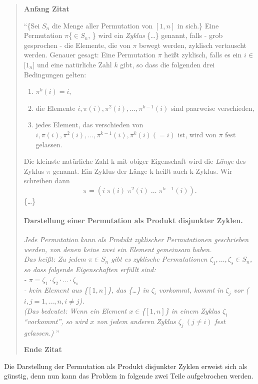 \begin{quotation}
\textbf{Anfang Zitat}

``\{Sei $S_n$ die Menge aller Permutation von $[1,n]$ in sich.\}
Eine Permutation $\pi$\{$\in S_n$, \} wird ein \emph{Zyklus} \{\dots\} genannt, falls - grob gesprochen - die Elemente, die von $\pi$ bewegt werden,
zyklisch vertauscht werden. Genauer gesagt: Eine Permutation $\pi$ heißt zyklisch,
falls es ein $ i \in $[$1_n$] und eine natürliche Zahl $k$ gibt, so dass die folgenden drei Bedingungen gelten:
\begin{enumerate}
 \item $\pi^k(i) = i$,
 \item die Elemente $i,\pi(i),\pi^2(i),\dots,\pi^{k-1}(i)$ sind paarweise verschieden,
 \item jedes Element, das verschieden von $i,\pi(i),\pi^2(i),\dots,\pi^{k-1}(i), \pi^k(i) (=i)$ ist, wird von $\pi$ fest gelassen.
\end{enumerate}
Die kleinste natürliche Zahl k mit obiger Eigenschaft wird die \emph{Länge} des Zyklus $\pi$ genannt.
Ein Zyklus der Länge k heißt auch k-Zyklus. Wir schreiben dann \[\pi=(i\;\pi(i)\;\pi^2(i) \; \dots \;\pi^{k-1}(i)).\]
\{\dots\}
\paragraph{Darstellung einer Permutation als Produkt disjunkter Zyklen.}
\emph{Jede Permutation kann als Produkt zyklischer Permutationen geschrieben werden, von denen keine zwei ein Element gemeinsam haben.}\\
\emph{Das heißt: Zu jedem $\pi \in S_n$ gibt es zyklische Permutationen $\zeta_1,\dots,\zeta_s \in S_n$,
so dass folgende Eigenschaften erfüllt sind: \\
 - $\pi=\zeta_1\cdot \zeta_2 \cdot \ldots \cdot \zeta_s$ \\
 - kein Element aus \{$[1,n]$\}, das \{\dots\} in $\zeta_i$ vorkommt, kommt in $\zeta_j$ vor ($i,j=1, \dots,n, i \neq j$).\\
(Das bedeutet: Wenn ein Element $x \in$\{$[1,n]$\} in einem Zyklus $\zeta_i$ ``vorkommt'',
 so wird $x$ von jedem anderen Zyklus $\zeta_j \: (j \neq i)$ fest gelassen.)
}''

\textbf{Ende Zitat}
\end{quotation}

Die Darstellung der Permutation als Produkt disjunkter Zyklen erweist sich als günstig,
denn nun kann das Problem in folgende zwei Teile aufgebrochen werden.

